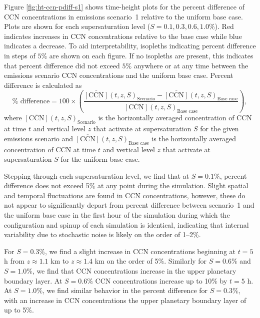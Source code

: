 Figure \ref{fig:ht-ccn-pdiff-s1} shows time-height plots for the percent difference of CCN concentrations in emissions scenario~1 relative to the uniform base case. Plots are shown for each supersaturation level ($S=0.1, 0.3, 0.6, 1.0\%$). Red indicates increases in CCN concentrations relative to the base case while blue indicates a decrease. To aid interpretability, isopleths indicating percent difference in steps of $5\%$ are shown on each figure. If no isopleths are present, this indicates that percent difference did not exceed $5\%$ anywhere or at any time between the emissions scenario CCN concentrations and the uniform base case. Percent difference is calculated as 
\begin{equation}
    \% \text{ difference} = 100\times\left(\frac{\overline{[\text{CCN}]}(t, z, S)_{\text{Scenario}} - \overline{[\text{CCN}]}(t, z, S)_{\text{Base case}}}{\overline{[\text{CCN}]}(t, z, S)_{\text{Base case}}}\right),
\end{equation}
where $\overline{[\text{CCN}]}(t, z,S)_{\text{Scenario}}$ is the horizontally averaged concentration of CCN at time $t$ and vertical level $z$ that activate at supersaturation $S$ for the given emissions scenario and $\overline{[\text{CCN}]}(t, z, S)_{\text{Base case}}$ is the horizontally averaged concentration of CCN at time $t$ and vertical level $z$ that activate at supersaturation $S$ for the uniform base case.

Stepping through each supersaturation level, we find that at $S=0.1\%$, percent difference does not exceed 5\% at any point during the simulation. Slight spatial and temporal fluctuations are found in CCN concentrations, however, these do not appear to significantly depart from percent difference between scenario~1 and the uniform base case in the first hour of the simulation during which the configuration and spinup of each simulation is identical, indicating that internal variability due to stochastic noise is likely on the order of 1--2\%.

For $S=0.3\%$, we find a slight increase in CCN concentrations beginning at $t=5$ h from $z\approx1.1$ km to $z\approx1.4$ km on the order of 5\%. Similarly for $S=0.6\%$ and $S=1.0\%$, we find that CCN concentrations increase in the upper planetary boundary layer. At $S=0.6\%$ CCN concentrations increase up to 10\% by $t=5$ h. At $S=1.0\%$, we find similar behavior in the percent difference for $S=0.3\%$, with an increase in CCN concentrations the upper planetary boundary layer of up to 5\%.

